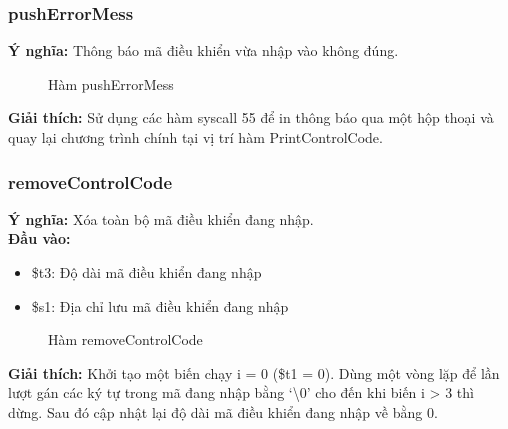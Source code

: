\documentclass[a4paper,12pt]{article}
\begin{document}
	\subsubsection{pushErrorMess}
	    \textbf{Ý nghĩa:} Thông báo mã điều khiển vừa nhập vào không đúng.\\
        \FloatBarrier
        \begin{figure}[ht!]
    	    \centerline{}
    	    \caption{Hàm pushErrorMess}
    	    \label{fig:bai100}
        \end{figure}
        \noindent
	    \textbf{Giải thích:} Sử dụng các hàm syscall 55 để in thông báo qua một hộp thoại và quay lại chương trình chính tại vị trí hàm PrintControlCode.
	\clearpage
	\subsubsection{removeControlCode}
	    \textbf{Ý nghĩa:} Xóa toàn bộ mã điều khiển đang nhập.\\
	    \textbf{Đầu vào:} 
	    \begin{itemize}
            \item \$t3: Độ dài mã điều khiển đang nhập
            \item \$s1: Địa chỉ lưu mã điều khiển đang nhập
        \end{itemize}
        \FloatBarrier
        \begin{figure}[ht!]
    	    \centerline{}
    	    \caption{Hàm removeControlCode}
    	    \label{fig:bai100}
        \end{figure}
        \noindent
	    \textbf{Giải thích:} Khởi tạo một biến chạy i = 0 (\$t1 = 0). Dùng một vòng lặp để lần lượt gán các ký tự trong mã đang nhập bằng ‘\textbackslash0’ cho đến khi biến i > 3 thì dừng. Sau đó cập nhật lại độ dài mã điều khiển đang nhập về bằng 0.
	\clearpage
\end{document}
